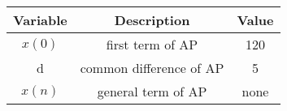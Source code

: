  \begin{tabular}{|c|c|c|} 
      \hline
\textbf{Variable}& \textbf{Description}& \textbf{Value}\\\hline
$x(0)$& first term of AP& 120  \\\hline
    d& common difference of AP & 5\\\hline
    $x(n)$ & general  term of AP&none\\\hline
\end{tabular}
